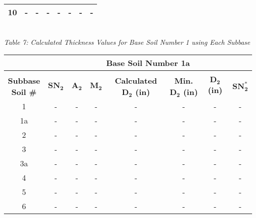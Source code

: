\documentclass{article}
\begin{document}
\begin{center}
\begin{spacing}{1.6}
\begin{tabular}{|c|ccccccc|}
                                            10      & -     & -    & -    & -                    & -              & -         & -       \\\hline
        \end{tabular}
        \vspace{3mm}
        \emph{\\Table 7: Calculated Thickness Values for Base Soil Number 1 using Each Subbase\\}
        \vspace{7mm}
        \begin{tabular}{|c|ccccccc|}
            \hline    
            \multicolumn{1}{|l}{}                     & \multicolumn{7}{c|}{\textbf{Base Soil Number 1a}}                                              \\\hline
            &&&&&&&\\
             \shortstack[c]{\textbf{Subbase}\\\textbf{Soil \#}} & $\bm{SN_2}$ & $\bm{A_2}$ & $\bm{M_2}$ & \textbf{Calculated $\bm{D_2}$ (in)} & \textbf{Min. $\bm{D_2}$ (in)} & \textbf{$\bm{D_2}$ (in)} & $\bm{SN_2^*}$  \\\hline
                                            1       & -     & -    & -    & -                    & -              & -         & -       \\
                                            1a      & -     & -    & -    & -                    & -              & -         & -       \\
                                            2       & -     & -    & -    & -                    & -              & -         & -       \\
                                            3       & -     & -    & -    & -                    & -              & -         & -       \\
                                            3a      & -     & -    & -    & -                    & -              & -         & -       \\
                                            4       & -     & -    & -    & -                    & -              & -         & -       \\
                                            5       & -     & -    & -    & -                    & -              & -         & -       \\
                                            6       & -     & -    & -    & -                    & -              & -         & -       \\

\end{tabular}
\end{spacing}
\end{center}
\end{document}
